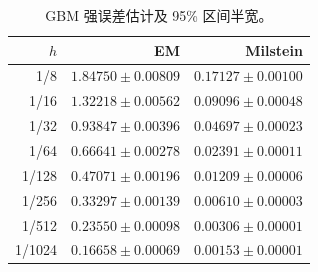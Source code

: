 \begin{table}[H]\centering\small
\caption{GBM 强误差估计及 95\% 区间半宽。}\label{tab:gbm-strong-cn}
\begin{tabular}{rrr}\toprule
$h$ & EM & Milstein\\\midrule
1/8 & $1.84750\pm0.00809$ & $0.17127\pm0.00100$\\
1/16 & $1.32218\pm0.00562$ & $0.09096\pm0.00048$\\
1/32 & $0.93847\pm0.00396$ & $0.04697\pm0.00023$\\
1/64 & $0.66641\pm0.00278$ & $0.02391\pm0.00011$\\
1/128 & $0.47071\pm0.00196$ & $0.01209\pm0.00006$\\
1/256 & $0.33297\pm0.00139$ & $0.00610\pm0.00003$\\
1/512 & $0.23550\pm0.00098$ & $0.00306\pm0.00001$\\
1/1024 & $0.16658\pm0.00069$ & $0.00153\pm0.00001$\\
\bottomrule\end{tabular}
\end{table}
